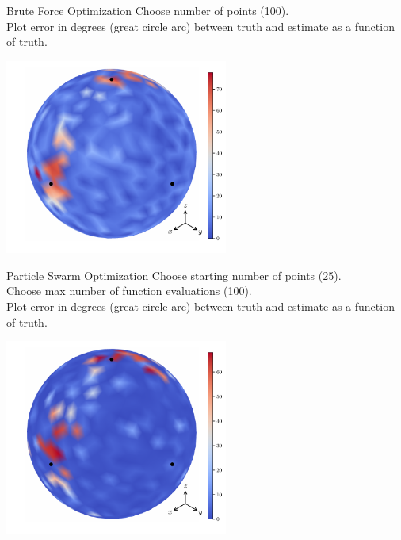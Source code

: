 \documentclass[presentation]{beamer}
\begin{document}
\begin{frame}[label=sec-8]{Brute Force Optimization}
Choose number of points (100). \\
Plot error in degrees (great circle arc) between truth and estimate as a function of truth. \\
\begin{center}
  \includegraphics[width=0.55\textwidth, interpolate=true]{figs/angle-error-brute.pdf}\\
\end{center}
\end{frame}
\begin{frame}[label=sec-9]{Particle Swarm Optimization}
Choose starting number of points (25). \\
    Choose max number of function evaluations (100). \\
    Plot error in degrees (great circle arc) between truth and estimate as a function of truth. \\
\begin{center}
  \includegraphics[width=0.55\textwidth, interpolate=true]{figs/angle-error.pdf}\\
\end{center}
\end{frame}
\end{document}
